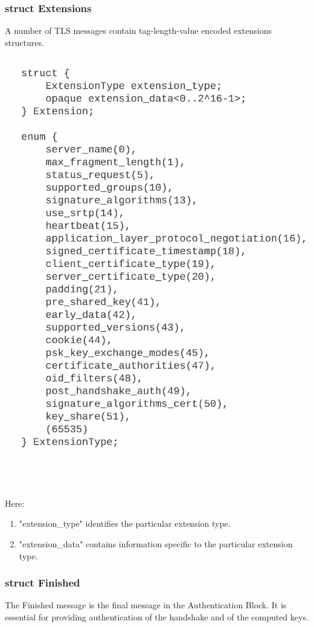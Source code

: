 \documentclass{article}
\begin{document}
\subsubsection{struct Extensions}
A number of TLS messages contain tag-length-value encoded extensions structures.
\begin{center}
    \includegraphics[width=0.8\columnwidth]{media/Extension.png}
\end{center}

Here:
\begin{center}
    \begin{enumerate}
        \item "extension\_type" identifies the particular extension type.
        \item "extension\_data" contains information specific to the particular extension type.
    \end{enumerate}
\end{center}

\subsubsection{struct Finished}
The Finished message is the final message in the Authentication Block.
It is essential for providing authentication of the handshake and of the computed keys.
\end{document}
